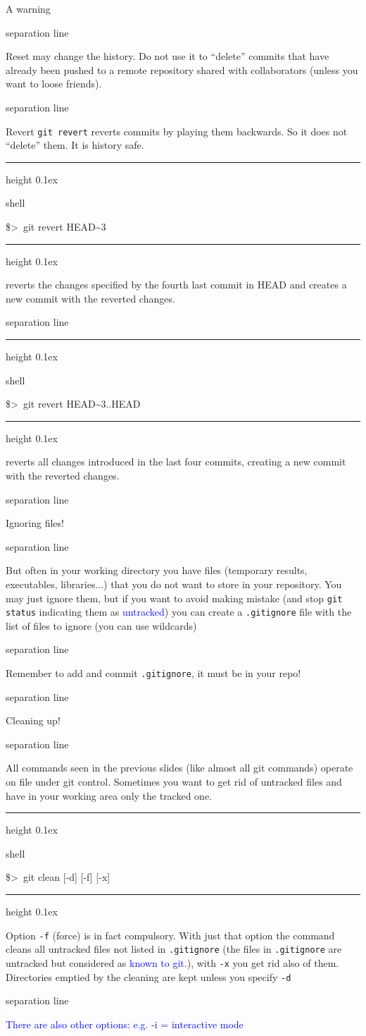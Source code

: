 \documentclass[hyperref={colorlinks}]{beamer}
\newenvironment{shell}{%
\footnotesize\flushleft\hrule height 0.1ex
\tt\begin{beamercolorbox}[sep=1ex,left]{shell}%
}{%
\end{beamercolorbox}
\hrule height 0.1ex
\endflushleft\par
}
\newcommand*{\psone}[1][ant]{\$>~}
\newcommand{\titleline}[1][0.025cm]{%
\begin{beamercolorbox}[wd=\paperwidth,ht=#1,center]{separation line}%
\end{beamercolorbox}%
}
\begin{document}
\begin{frame}{A warning}
\titleline
Reset may change the history. \alert{Do not use it to ``delete'' commits that have already been pushed to a remote repository shared with collaborators} (unless you want to loose friends).
\smallskip


\titleline

\end{frame}

\begin{frame}{Revert}
\texttt{git revert} reverts commits by \alert{playing them backwards}. So it does not ``delete'' them. It is history safe.
\begin{shell}
\psone git revert HEAD\textasciitilde{}3
\end{shell}
reverts the changes specified by the fourth last commit in HEAD and
          creates a new commit with the reverted changes.

\titleline
\begin{shell}
\psone git revert HEAD\textasciitilde{}3..HEAD
\end{shell}
reverts all changes introduced in the last four commits,
          creating a new commit with the reverted changes.
\titleline
\end{frame}
\begin{frame}{Ignoring files!}
  \titleline
  But often in your working directory you have files
  (temporary results, executables, libraries...) that you \alert{do
    not want to store in your repository}. You may just ignore them,
  but if you want to avoid making mistake (and stop \texttt{git
    status} indicating them as \textcolor{blue}{untracked}) you can
  create a \alert{\texttt{.gitignore}} file with the list of files to ignore (you can use wildcards)
  \titleline
  
  \alert{Remember to add and commit \texttt{.gitignore}, it must be in your repo!}
  \titleline

\end{frame}

\begin{frame}{Cleaning up!}
  \titleline
  All commands seen in the previous slides (like almost all git commands) operate on file under git control.
  Sometimes you want to get rid of \alert{untracked files} and have in your working area only
  the tracked one.
\begin{shell}
\psone git clean [-d] [-f] [-x]
\end{shell}

Option \texttt{-f} (force) is in fact \alert{compulsory}. With just that option the command cleans all untracked files not listed in \texttt{.gitignore} (the files in \texttt{.gitignore} are untracked but considered as \textcolor{blue}{known to git}.), with \texttt{-x} you get rid also of them. Directories emptied by the cleaning are kept unless you specify \texttt{-d}
\titleline

\textcolor{blue}{There are also other options: e.g. -i = interactive mode}

\end{frame}
\end{document}

